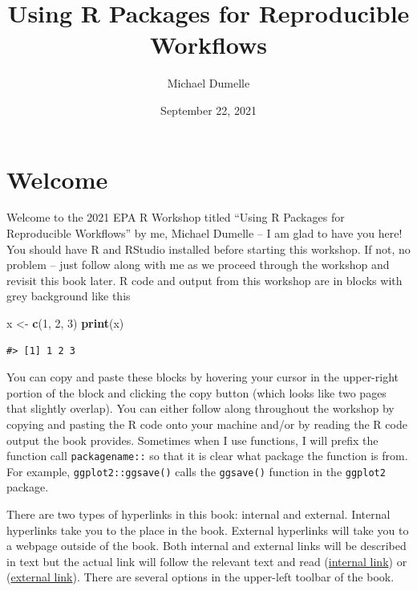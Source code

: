 \documentclass[
]{book}
\title{Using R Packages for Reproducible Workflows}
\author{Michael Dumelle}
\date{September 22, 2021}
\newenvironment{Shaded}{\begin{snugshade}}{\end{snugshade}}
\newcommand{\DecValTok}[1]{\textcolor[rgb]{0.00,0.00,0.81}{#1}}
\newcommand{\KeywordTok}[1]{\textcolor[rgb]{0.13,0.29,0.53}{\textbf{#1}}}
\newcommand{\NormalTok}[1]{#1}
\newcommand{\StringTok}[1]{\textcolor[rgb]{0.31,0.60,0.02}{#1}}
\begin{document}
\maketitle

{
\setcounter{tocdepth}{1}
\tableofcontents
}
\hypertarget{welcome}{%
\chapter*{Welcome}\label{welcome}}

Welcome to the 2021 EPA R Workshop titled ``Using R Packages for Reproducible Workflows'' by me, Michael Dumelle -- I am glad to have you here! You should have R and RStudio installed before starting this workshop. If not, no problem -- just follow along with me as we proceed through the workshop and revisit this book later. R code and output from this workshop are in blocks with grey background like this

\begin{Shaded}
\begin{Highlighting}[]
\NormalTok{x <-}\StringTok{ }\KeywordTok{c}\NormalTok{(}\DecValTok{1}\NormalTok{, }\DecValTok{2}\NormalTok{, }\DecValTok{3}\NormalTok{)}
\KeywordTok{print}\NormalTok{(x)}
\end{Highlighting}
\end{Shaded}

\begin{verbatim}
#> [1] 1 2 3
\end{verbatim}

You can copy and paste these blocks by hovering your cursor in the upper-right portion of the block and clicking the copy button (which looks like two pages that slightly overlap). You can either follow along throughout the workshop by copying and pasting the R code onto your machine and/or by reading the R code output the book provides. Sometimes when I use functions, I will prefix the function call \texttt{packagename::} so that it is clear what package the function is from. For example, \texttt{ggplot2::ggsave()} calls the \texttt{ggsave()} function in the \texttt{ggplot2} package.

There are two types of hyperlinks in this book: internal and external. Internal hyperlinks take you to the place in the book. External hyperlinks will take you to a webpage outside of the book. Both internal and external links will be described in text but the actual link will follow the relevant text and read (\href{}{internal link}) or (\href{}{external link}). There are several options in the upper-left toolbar of the book.
\end{document}
